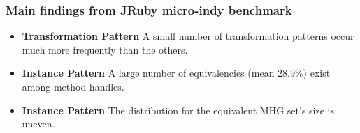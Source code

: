 \documentclass{beamer}
\begin{document}
\begin{frame}
  \frametitle{Main findings from JRuby micro-indy benchmark }
  \begin{itemize}[<+->]
     \item \textbf{Transformation Pattern} A small number of transformation patterns occur much more frequently than the others.  

     \item \textbf{Instance Pattern} A large number of equivalencies (mean 28.9\%) exist among method handles.%

     \item \textbf{Instance Pattern} The distribution for the equivalent MHG set's size is uneven. 
  \end{itemize}
\end{frame}
\end{document}
